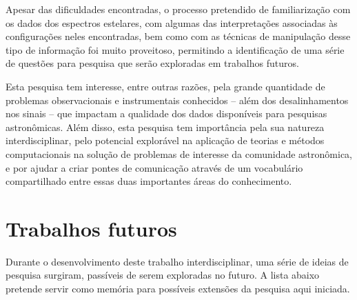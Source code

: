 Apesar das dificuldades encontradas, o processo pretendido de familiarização com os dados dos espectros estelares, com algumas das interpretações associadas às configurações neles encontradas, bem como com as técnicas de manipulação desse tipo de informação foi muito proveitoso, permitindo a identificação de uma série de questões para pesquisa que serão exploradas em trabalhos futuros.

Esta pesquisa tem interesse, entre outras razões, pela grande quantidade de problemas observacionais e instrumentais conhecidos -- além dos desalinhamentos nos sinais -- que impactam a qualidade dos dados disponíveis para pesquisas astronômicas. Além disso, esta pesquisa tem importância pela sua natureza interdisciplinar, pelo potencial explorável na aplicação de teorias e métodos computacionais na solução de problemas de interesse da comunidade astronômica, e por ajudar a criar pontes de comunicação através de um vocabulário compartilhado entre essas duas importantes áreas do conhecimento.

\section{Trabalhos futuros}

Durante o desenvolvimento deste trabalho interdisciplinar, uma série de ideias de pesquisa surgiram, passíveis de serem exploradas no futuro. A lista abaixo pretende servir como memória para possíveis extensões da pesquisa aqui iniciada.


